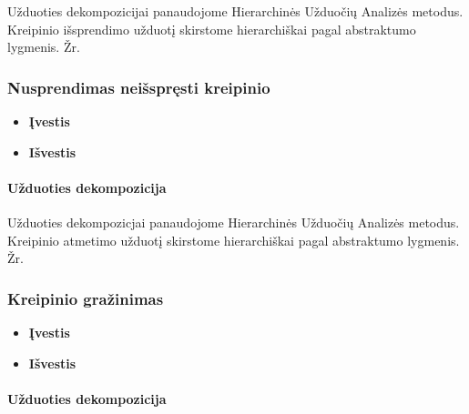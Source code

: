 	
	Užduoties dekompozicijai panaudojome Hierarchinės Užduočių Analizės metodus.
	Kreipinio išsprendimo užduotį skirstome hierarchiškai pagal abstraktumo lygmenis. 
	Žr. 
	
 		
	\subsubsection{Nusprendimas neišspręsti kreipinio}
	
		\begin{itemize}
			\item \textbf{Įvestis}
			\item \textbf{Išvestis} 
		\end{itemize}
		
		
	\paragraph{Užduoties dekompozicija} 
	
	
	Užduoties dekompozicjai panaudojome Hierarchinės Užduočių Analizės metodus.
	Kreipinio atmetimo užduotį skirstome hierarchiškai pagal abstraktumo lygmenis. 
	Žr. 
	
 		
	\subsubsection{Kreipinio gražinimas}	
	
		\begin{itemize}
			\item \textbf{Įvestis}
			\item \textbf{Išvestis} 
		\end{itemize}


	\paragraph{Užduoties dekompozicija} 


